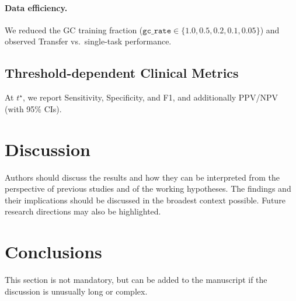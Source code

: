 \documentclass[diagnostics,article,submit,pdftex,moreauthors]{Definitions/mdpi}
\begin{document}
\paragraph{Data efficiency.}
We reduced the GC training fraction ($\texttt{gc\_rate}\in\{1.0,0.5,0.2,0.1,0.05\}$) and observed Transfer vs.\ single-task performance. %

\subsection{Threshold-dependent Clinical Metrics}
At $t^\star$, we report Sensitivity, Specificity, and F1, and additionally PPV/NPV (with 95\% CIs).


\section{Discussion}

Authors should discuss the results and how they can be interpreted from the perspective of previous studies and of the working hypotheses. The findings and their implications should be discussed in the broadest context possible. Future research directions may also be highlighted.

\section{Conclusions}

This section is not mandatory, but can be added to the manuscript if the discussion is unusually long or complex.

\vspace{6pt} 


\end{document}
